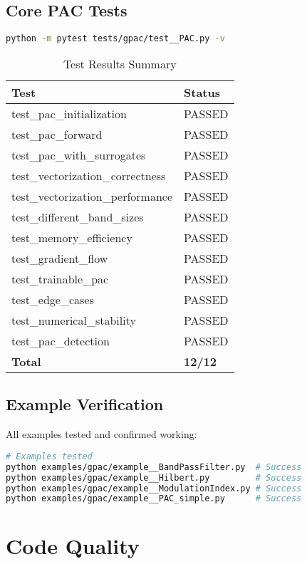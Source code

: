 \documentclass[11pt,a4paper]{article}
\begin{document}
\subsection{Core PAC Tests}

\begin{lstlisting}[language=bash]
python -m pytest tests/gpac/test__PAC.py -v
\end{lstlisting}

\begin{table}[h]
\centering
\begin{tabular}{ll}
\toprule
Test & Status \\
\midrule
test\_pac\_initialization & PASSED \\
test\_pac\_forward & PASSED \\
test\_pac\_with\_surrogates & PASSED \\
test\_vectorization\_correctness & PASSED \\
test\_vectorization\_performance & PASSED \\
test\_different\_band\_sizes & PASSED \\
test\_memory\_efficiency & PASSED \\
test\_gradient\_flow & PASSED \\
test\_trainable\_pac & PASSED \\
test\_edge\_cases & PASSED \\
test\_numerical\_stability & PASSED \\
test\_pac\_detection & PASSED \\
\midrule
\textbf{Total} & \textbf{12/12} \\
\bottomrule
\end{tabular}
\caption{Test Results Summary}
\end{table}

\subsection{Example Verification}

All examples tested and confirmed working:

\begin{lstlisting}[language=bash]
# Examples tested
python examples/gpac/example__BandPassFilter.py  # Success
python examples/gpac/example__Hilbert.py         # Success
python examples/gpac/example__ModulationIndex.py # Success
python examples/gpac/example__PAC_simple.py      # Success
\end{lstlisting}

\section{Code Quality}
\end{document}
